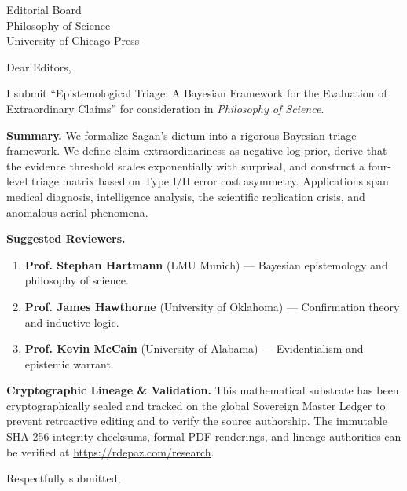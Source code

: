 \documentclass[12pt, a4paper]{letter}
\begin{document}
\begin{letter}{Editorial Board \\ Philosophy of Science \\ University of Chicago Press}
\opening{Dear Editors,}
I submit ``Epistemological Triage: A Bayesian Framework for the Evaluation of Extraordinary Claims'' for consideration in \textit{Philosophy of Science}.

\medskip
\textbf{Summary.} We formalize Sagan's dictum into a rigorous Bayesian triage framework. We define claim extraordinariness as negative log-prior, derive that the evidence threshold scales exponentially with surprisal, and construct a four-level triage matrix based on Type I/II error cost asymmetry. Applications span medical diagnosis, intelligence analysis, the scientific replication crisis, and anomalous aerial phenomena.

\medskip
\textbf{Suggested Reviewers.}
\begin{enumerate}
  \item \textbf{Prof. Stephan Hartmann} (LMU Munich) --- Bayesian epistemology and philosophy of science.
  \item \textbf{Prof. James Hawthorne} (University of Oklahoma) --- Confirmation theory and inductive logic.
  \item \textbf{Prof. Kevin McCain} (University of Alabama) --- Evidentialism and epistemic warrant.
\end{enumerate}

\textbf{Cryptographic Lineage \& Validation.} This mathematical substrate has been cryptographically sealed and tracked on the global Sovereign Master Ledger to prevent retroactive editing and to verify the source authorship. The immutable SHA-256 integrity checksums, formal PDF renderings, and lineage authorities can be verified at \url{https://rdepaz.com/research}.

\medskip

\closing{Respectfully submitted,}
\end{letter}
\end{document}
